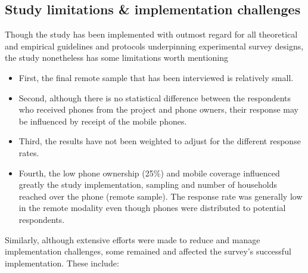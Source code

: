 \documentclass[11pt,harvard]{article}
\begin{document}
	
\pagebreak
	
	
\subsection{Study limitations \& implementation challenges}
Though the study has been implemented with outmost regard for all theoretical and empirical guidelines and protocols underpinning experimental survey designs, the study nonetheless has some limitations worth mentioning
\begin{itemize}
	\item First, the final remote sample that has been interviewed is relatively small. 
	\item Second, although there is no statistical difference between the respondents who received phones from the project and phone owners, their response may be influenced by receipt of the mobile phones. 
	\item Third, the results have not been weighted to adjust for the different response rates.
	\item Fourth, the low phone ownership (25\%) and mobile coverage influenced greatly the study implementation, sampling and number of households reached over the phone (remote sample). The response rate was generally low in the remote modality even though phones were distributed to potential respondents.
	\end{itemize}
	
Similarly, although extensive efforts were made to reduce and manage implementation challenges, some remained and affected the survey's successful implementation. These include:
\end{document}
